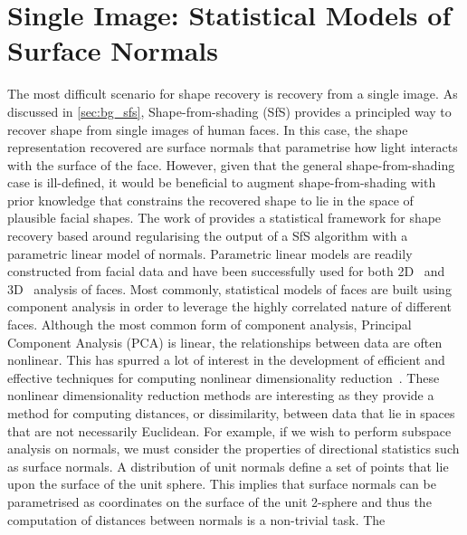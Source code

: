 \chapter{Single Image: Statistical Models of Surface Normals}\label{ch:singl_imag}
\minitoc{}
The most difficult scenario for shape recovery is recovery from a single
image. As discussed in \cref{sec:bg_sfs}, Shape-from-shading (SfS) provides a
principled way to recover shape from single images of human faces. In this case,
the shape representation recovered are surface normals that parametrise how
light interacts with the surface of the face. However, given that the general
shape-from-shading case is ill-defined, it would be beneficial to augment
shape-from-shading with prior knowledge that constrains the recovered shape to
lie in the space of plausible facial shapes. The work of
\citet{smith2006recovering,smith2008facial}
provides a statistical framework for shape recovery based around regularising
the output of a SfS algorithm with a parametric linear model of normals.
Parametric linear models are readily constructed from facial data and have
been successfully used for both 2D~\cite{cootes2001active,turk1991eigenfaces}
and 3D~\cite{enciso1999synthesis,atick1996statistical} analysis of faces.
Most commonly, statistical models of faces are built using component analysis
in order to leverage the highly correlated nature of different faces. Although
the most common form of component analysis, Principal Component Analysis (PCA)
is linear, the relationships between data are often nonlinear.
This has spurred a lot of interest in the development of
efficient and effective techniques for computing nonlinear dimensionality
reduction~\cite{yang2005kpca,goudelis2007class,scholkopf1998nonlinear}. These
nonlinear dimensionality reduction methods are interesting as they provide
a method for computing distances, or dissimilarity, between data that
lie in spaces that are not necessarily Euclidean. For example, if we wish to
perform subspace analysis on normals, we must consider the properties of
directional statistics such as surface normals.
A distribution of unit normals define a set of points that lie upon the
surface of the unit sphere. This implies that surface normals can be
parametrised as coordinates on the surface of the unit 2-sphere and thus
the computation of distances between normals is a non-trivial task. The
